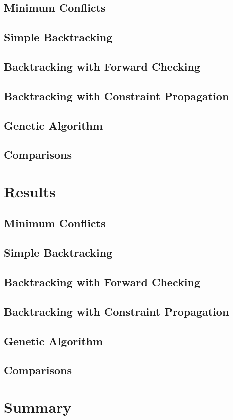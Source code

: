 \documentclass{article}
\begin{document}
	\subsection{Minimum Conflicts}
	
	\subsection{Simple Backtracking}
	
	\subsection{Backtracking with Forward Checking}
	
	\subsection{Backtracking with Constraint Propagation}
	
	\subsection{Genetic Algorithm}
	
	\subsection{Comparisons}
	
\section{Results}

	\subsection{Minimum Conflicts}
	
	\subsection{Simple Backtracking}
	
	\subsection{Backtracking with Forward Checking}
	
	\subsection{Backtracking with Constraint Propagation}
	
	\subsection{Genetic Algorithm}
	
	\subsection{Comparisons}
	
\section{Summary}

	




	
	
	
\end{document}
